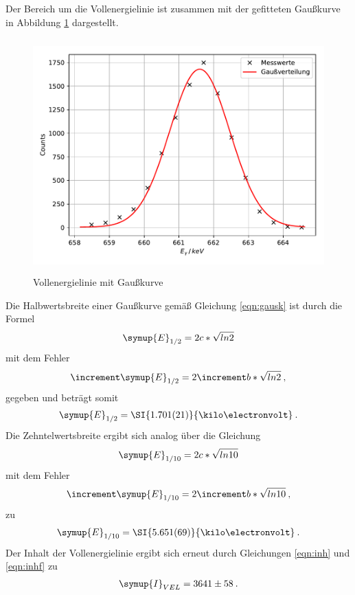 Der Bereich um die Vollenergielinie ist zusammen mit der gefitteten Gaußkurve in
Abbildung \ref{fig:plot6} dargestellt.
\begin{figure}
  \centering
  \includegraphics[height=9cm]{Plot6.pdf}
  \caption{Vollenergielinie mit Gaußkurve}
  \label{fig:plot6}
\end{figure}
Die Halbwertsbreite einer Gaußkurve gemäß Gleichung \ref{eqn:gausk} ist durch die
Formel
\begin{equation}
  \symup{E}_{1/2} = 2c*\sqrt{ln2}
\end{equation}
mit dem Fehler
\begin{equation}
  \increment \symup{E}_{1/2} = 2\increment b*\sqrt{ln2} \: ,
\end{equation}
gegeben und beträgt somit
\begin{align*}
  \symup{E}_{1/2} = \SI{1.701(21)}{\kilo\electronvolt} \: .
\end{align*}
Die Zehntelwertsbreite ergibt sich analog über die Gleichung
\begin{equation}
  \symup{E}_{1/10} = 2c*\sqrt{ln10}
\end{equation}
mit dem Fehler
\begin{equation}
  \increment \symup{E}_{1/10} = 2\increment b*\sqrt{ln10} \: ,
\end{equation}
zu
\begin{align*}
  \symup{E}_{1/10} = \SI{5.651(69)}{\kilo\electronvolt} \: .
\end{align*}
Der Inhalt der Vollenergielinie ergibt sich erneut durch Gleichungen \ref{eqn:inh}
und \ref{eqn:inhf} zu
\begin{align*}
  \symup{I}_{VEL} =  3641 \pm 58 \: .
\end{align*}
